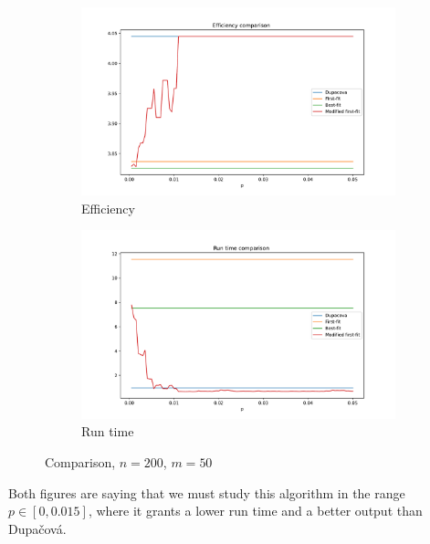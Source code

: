 \documentclass{amsart}
\begin{document}
\begin{figure}[!h]
    \centering
    \begin{subfigure}[b]{0.495\textwidth}
        \centering
        \includegraphics[width=1.1\textwidth]{plots/efficiency p.pdf}
        \caption{Efficiency}
    \end{subfigure}
    \hfill
    \begin{subfigure}[b]{0.495\textwidth}
        \centering
        \includegraphics[width=1.1\textwidth]{plots/run time p.pdf}
        \caption{Run time}
    \end{subfigure}
    \caption{Comparison, $n=200$, $m=50$}
    \label{p}
\end{figure}

Both figures are saying that we must study this algorithm in the range $p\in\left[0,0.015\right]$, where it grants a lower run time and a better output than Dupačová.  
\end{document}
